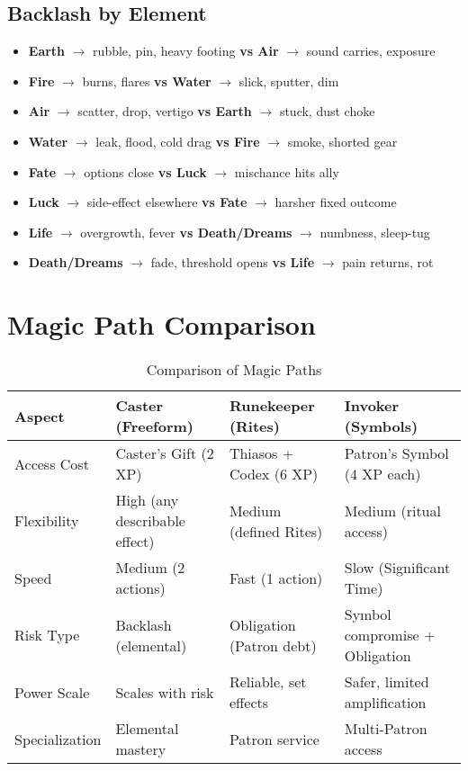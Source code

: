 \subsection{Backlash by Element}
\label{subsec:backlash-elements}
\begin{itemize}
  \item \textbf{Earth} $\rightarrow$ rubble, pin, heavy footing \quad \textbf{vs Air} $\rightarrow$ sound carries, exposure
  \item \textbf{Fire} $\rightarrow$ burns, flares \quad \textbf{vs Water} $\rightarrow$ slick, sputter, dim
  \item \textbf{Air} $\rightarrow$ scatter, drop, vertigo \quad \textbf{vs Earth} $\rightarrow$ stuck, dust choke
  \item \textbf{Water} $\rightarrow$ leak, flood, cold drag \quad \textbf{vs Fire} $\rightarrow$ smoke, shorted gear
  \item \textbf{Fate} $\rightarrow$ options close \quad \textbf{vs Luck} $\rightarrow$ mischance hits ally
  \item \textbf{Luck} $\rightarrow$ side-effect elsewhere \quad \textbf{vs Fate} $\rightarrow$ harsher fixed outcome
  \item \textbf{Life} $\rightarrow$ overgrowth, fever \quad \textbf{vs Death/Dreams} $\rightarrow$ numbness, sleep-tug
  \item \textbf{Death/Dreams} $\rightarrow$ fade, threshold opens \quad \textbf{vs Life} $\rightarrow$ pain returns, rot
\end{itemize}

\section{Magic Path Comparison}
\label{sec:path-comparison}
\begin{table}[htbp]
\centering
\begin{tabular}{p{3.1cm}p{4cm}p{4cm}p{4cm}}
\toprule
\textbf{Aspect} & \textbf{Caster (Freeform)} & \textbf{Runekeeper (Rites)} & \textbf{Invoker (Symbols)} \\
\midrule
Access Cost & Caster's Gift (2 XP) & Thiasos + Codex (6 XP) & Patron's Symbol (4 XP each) \\
Flexibility & High (any describable effect) & Medium (defined Rites) & Medium (ritual access) \\
Speed & Medium (2 actions) & Fast (1 action) & Slow (Significant Time) \\
Risk Type & Backlash (elemental) & Obligation (Patron debt) & Symbol compromise + Obligation \\
Power Scale & Scales with risk & Reliable, set effects & Safer, limited amplification \\
Specialization & Elemental mastery & Patron service & Multi-Patron access \\
\bottomrule
\end{tabular}
\caption{Comparison of Magic Paths}
\end{table}

